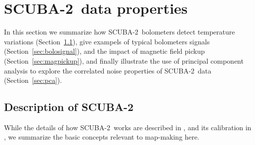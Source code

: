 \documentclass[useAMS,usenatbib,nofootinbib]{mn2e}
\newcommand{\scuba}{SCUBA-2}
\begin{document}


\section{\scuba\ data properties}
\label{sec:data}

In this section we summarize how \scuba\ bolometers detect temperature
variations (Section~\ref{sec:bolos}), give exampels of typical
bolometers signals (Section~\ref{sec:bolosignal}), and the impact of
magnetic field pickup (Section~\ref{sec:magpickup}), and finally
illustrate the use of principal component analysis to explore the
correlated noise properties of \scuba\ data (Section~\ref{sec:pca}).

\subsection{Description of \scuba}
\label{sec:bolos}

While the details of how \scuba\ works are described in
\citet{holland2012}, and its calibration in \citet{dempsey2012}, we
summarize the basic concepts relevant to map-making here.
\end{document}
